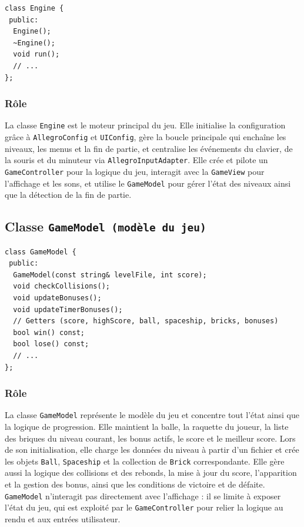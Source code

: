\documentclass[12pt]{article}
\begin{document}
\begin{lstlisting}
class Engine {
 public:
  Engine();
  ~Engine();
  void run();
  // ...
};

\end{lstlisting}

\subsubsection* {Rôle}

La classe \colorbox{gray!20}{\texttt{Engine}} est le moteur principal du jeu. Elle initialise la configuration grâce à \colorbox{gray!20}{\texttt{AllegroConfig}} et \colorbox{gray!20}{\texttt{UIConfig}}, gère la boucle principale qui enchaîne les niveaux, les menus et la fin de partie, et centralise les événements du clavier, de la souris et du minuteur via \colorbox{gray!20}{\texttt{AllegroInputAdapter}}. Elle crée et pilote un \colorbox{gray!20}{\texttt{GameController}} pour la logique du jeu, interagit avec la \colorbox{gray!20}{\texttt{GameView}} pour l’affichage et les sons, et utilise le \colorbox{gray!20}{\texttt{GameModel}} pour gérer l’état des niveaux ainsi que la détection de la fin de partie.




\subsection{Classe \texttt{GameModel (modèle du jeu)}}



\begin{lstlisting}
class GameModel {
 public:
  GameModel(const string& levelFile, int score);
  void checkCollisions();
  void updateBonuses();
  void updateTimerBonuses();
  // Getters (score, highScore, ball, spaceship, bricks, bonuses)
  bool win() const;
  bool lose() const;
  // ...
};
\end{lstlisting}

\subsubsection* {Rôle}
La classe \colorbox{gray!20}{\texttt{GameModel}} représente le modèle du jeu et concentre tout l’état ainsi que la logique de progression. Elle maintient la balle, la raquette du joueur, la liste des briques du niveau courant, les bonus actifs, le score et le meilleur score. Lors de son initialisation, elle charge les données du niveau à partir d’un fichier et crée les objets \colorbox{gray!20}{\texttt{Ball}}, \colorbox{gray!20}{\texttt{Spaceship}} et la collection de \colorbox{gray!20}{\texttt{Brick}} correspondante. Elle gère aussi la logique des collisions et des rebonds, la mise à jour du score, l’apparition et la gestion des bonus, ainsi que les conditions de victoire et de défaite. \colorbox{gray!20}{\texttt{GameModel}} n’interagit pas directement avec l’affichage : il se limite à exposer l’état du jeu, qui est exploité par le \colorbox{gray!20}{\texttt{GameController}} pour relier la logique au rendu et aux entrées utilisateur.
\end{document}
